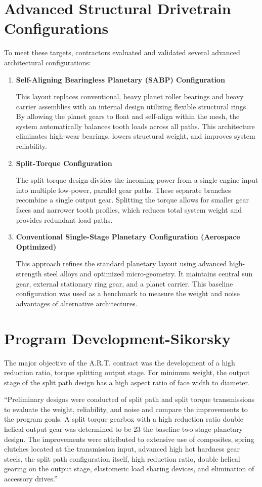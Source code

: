 \section{Advanced Structural Drivetrain Configurations}
	To meet these targets, contractors evaluated and validated several advanced architectural configurations: 
		\begin{enumerate}
			\item \textbf{Self-Aligning Bearingless Planetary (SABP) Configuration}\par
			This layout replaces conventional, heavy planet roller bearings and heavy carrier assemblies with an 
			internal design utilizing flexible structural rings. By allowing the planet gears to float and self-align 
			within the mesh, the system automatically balances tooth loads across all paths. This architecture eliminates 
			high-wear bearings, lowers structural weight, and improves system reliability. 
			\item \textbf{Split-Torque Configuration}\par
			The split-torque design divides the incoming power from a single engine input into multiple low-power, 
			parallel gear paths. These separate branches recombine a single output gear. Splitting the torque allows for 
			smaller gear faces and narrower tooth profiles, which reduces total system weight and provides redundant load paths. 
			\item \textbf{Conventional Single-Stage Planetary Configuration (Aerospace Optimized)}\par
			This approach refines the standard planetary layout using advanced high-strength steel alloys and optimized 
			micro-geometry. It maintains central sun gear, external stationary ring gear, and a planet carrier. 
			This baseline configuration was used as a benchmark to measure the weight and noise advantages of alternative architectures. 
		\end{enumerate}

\section{Program Development-Sikorsky}
	The major objective of the A.R.T. contract was the development of a high reduction ratio, torque splitting output stage. 
	For minimum weight, the output stage of the split path design has a high aspect ratio of face width to diameter.  

	“Preliminary designs were conducted of split path and split torque transmissions to evaluate the weight, reliability, 
	and noise and compare the improvements to the program goals. A split torque gearbox with a high reduction ratio double 
	helical output gear was determined to be 23%
	the baseline two stage planetary design. The improvements were attributed to extensive use of composites, spring clutches 
	located at the transmission input, advanced high hot hardness gear steels, the split path configuration itself, 
	high reduction ratio, double helical gearing on the output stage, elastomeric load sharing devices, and elimination of 
	accessory drives.” 

